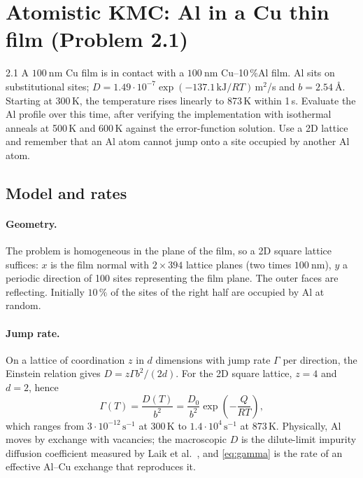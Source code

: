 \documentclass[11pt,a4paper]{article}
\numberwithin{equation}{section}
\theoremstyle{remark}
\begin{document}
\section{Atomistic KMC: Al in a Cu thin film (Problem 2.1)}\label{sec:atomistic}

\begin{task}{2.1}
  A $\SI{100}{\nano\metre}$ Cu film is in contact with a $\SI{100}{\nano\metre}$ Cu--10\,\%Al film. Al
  sits on substitutional sites; $D = 1.49\cdot10^{-7}\exp(-137.1\,\mathrm{kJ}/RT)$\,m$^2$/s and
  $b = \SI{2.54}{\angstrom}$. Starting at 300\,K, the temperature rises linearly to 873\,K within 1\,s.
  Evaluate the Al profile over this time, after verifying the implementation with isothermal anneals at
  500\,K and 600\,K against the error-function solution. Use a 2D lattice and remember that an Al atom
  cannot jump onto a site occupied by another Al atom.
\end{task}

\subsection{Model and rates}\label{sec:atmodel}

\paragraph{Geometry.}
The problem is homogeneous in the plane of the film, so a 2D square lattice suffices: $x$ is the film
normal with $2\times394$ lattice planes (two times $\SI{100}{\nano\metre}$), $y$ a periodic direction of
100 sites representing the film plane. The outer faces are reflecting. Initially $10\,\%$ of the sites
of the right half are occupied by Al at random.

\paragraph{Jump rate.}
On a lattice of coordination $z$ in $d$ dimensions with jump rate $\Gamma$ per direction, the
Einstein relation gives $D = z\Gamma b^2/(2d)$. For the 2D square lattice, $z = 4$ and $d = 2$, hence
\begin{equation}\label{eq:gamma}
  \Gamma(T) = \frac{D(T)}{b^2} = \frac{D_0}{b^2}\exp\!\left(-\frac{Q}{RT}\right),
\end{equation}
which ranges from $3\cdot10^{-12}\,\mathrm{s^{-1}}$ at 300\,K to $1.4\cdot10^{4}\,\mathrm{s^{-1}}$ at
873\,K. Physically, Al moves by exchange with vacancies; the macroscopic $D$ is the dilute-limit
impurity diffusion coefficient measured by Laik et al.~\citep{laik2008}, and \cref{eq:gamma} is the
rate of an effective Al--Cu exchange that reproduces it.
\end{document}
